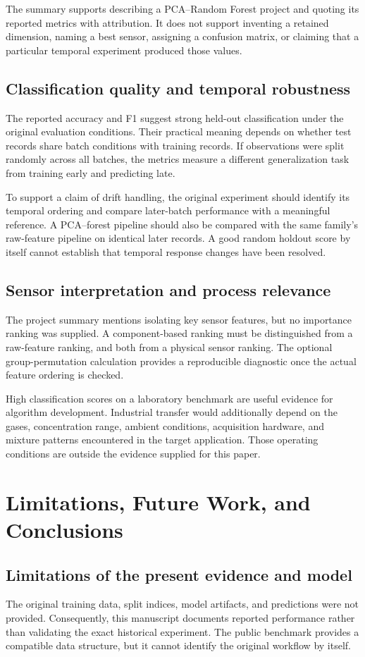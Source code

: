 \documentclass[11pt,a4paper]{article}
\newcommand{\sectionpage}[1]{\clearpage\section{#1}}
\begin{document}
The summary supports describing a PCA--Random Forest project and quoting its reported metrics with attribution. It does not support inventing a retained dimension, naming a best sensor, assigning a confusion matrix, or claiming that a particular temporal experiment produced those values.

\subsection{Classification quality and temporal robustness}
The reported accuracy and F1 suggest strong held-out classification under the original evaluation conditions. Their practical meaning depends on whether test records share batch conditions with training records. If observations were split randomly across all batches, the metrics measure a different generalization task from training early and predicting late.

To support a claim of drift handling, the original experiment should identify its temporal ordering and compare later-batch performance with a meaningful reference. A PCA--forest pipeline should also be compared with the same family's raw-feature pipeline on identical later records. A good random holdout score by itself cannot establish that temporal response changes have been resolved.

\subsection{Sensor interpretation and process relevance}
The project summary mentions isolating key sensor features, but no importance ranking was supplied. A component-based ranking must be distinguished from a raw-feature ranking, and both from a physical sensor ranking. The optional group-permutation calculation provides a reproducible diagnostic once the actual feature ordering is checked.

High classification scores on a laboratory benchmark are useful evidence for algorithm development. Industrial transfer would additionally depend on the gases, concentration range, ambient conditions, acquisition hardware, and mixture patterns encountered in the target application. Those operating conditions are outside the evidence supplied for this paper.

\sectionpage{Limitations, Future Work, and Conclusions}
\subsection{Limitations of the present evidence and model}
The original training data, split indices, model artifacts, and predictions were not provided. Consequently, this manuscript documents reported performance rather than validating the exact historical experiment. The public benchmark provides a compatible data structure, but it cannot identify the original workflow by itself.
\end{document}
